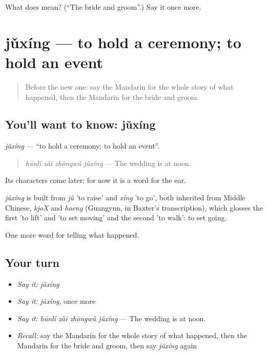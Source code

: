 \begin{tcolorbox}[breakable,colback=teal!4,colframe=teal!35!black,title={Before you move on}]
What does  mean? (\textquotedblleft{}The bride and groom\textquotedblright{}.) Say it once more.
\end{tcolorbox}
\section[jǔxíng]{jǔxíng — to hold a ceremony; to hold an event}

\label{lesson:ZH-C306-juxing}



\begin{quote}
Before the new one: say the Mandarin for the whole story of what happened, then the Mandarin for the bride and groom.
\end{quote}

\subsection*{You'll want to know: jǔxíng}
\emph{jǔxíng} — \textquotedblleft{}to hold a ceremony; to hold an event\textquotedblright{}.

\begin{quote}
\emph{hūnlǐ zài zhōngwǔ jǔxíng} — The wedding is at noon.
\end{quote}

Its characters come later; for now it is a word for the ear.

\begin{cousinweb}
\emph{jǔxíng} is built from \emph{jǔ} 'to raise' and \emph{xíng} 'to go', both inherited from Middle Chinese, \emph{kjoX} and \emph{haeng} (Guangyun, in Baxter's transcription), which glosses the first 'to lift' and 'to set moving' and the second 'to walk': to set going.
\end{cousinweb}

\begin{grammarlens}[title={What you've built}]
One more word for telling what happened.
\end{grammarlens}

\subsection*{Your turn}
\begin{itemize}
\raggedright
  \item \emph{Say it:} \emph{jǔxíng}
  \item \emph{Say it:} \emph{jǔxíng}, once more
  \item \emph{Say it:} \emph{hūnlǐ zài zhōngwǔ jǔxíng} — The wedding is at noon.
  \item \emph{Recall:} say the Mandarin for the whole story of what happened, then the Mandarin for the bride and groom, then say \emph{jǔxíng} again
\end{itemize}

